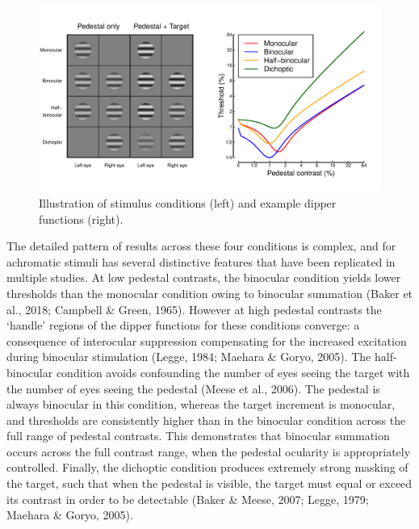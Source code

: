 \documentclass[
]{article}
\begin{document}
\begin{figure}

{\centering \includegraphics{Figures/exampledips} 

}

\caption{Illustration of stimulus conditions (left) and example dipper functions (right).}\label{fig:exampledips}
\end{figure}

The detailed pattern of results across these four conditions is complex, and for achromatic stimuli has several distinctive features that have been replicated in multiple studies. At low pedestal contrasts, the binocular condition yields lower thresholds than the monocular condition owing to binocular summation (Baker et al., 2018; Campbell \& Green, 1965). However at high pedestal contrasts the `handle' regions of the dipper functions for these conditions converge: a consequence of interocular suppression compensating for the increased excitation during binocular stimulation (Legge, 1984; Maehara \& Goryo, 2005). The half-binocular condition avoids confounding the number of eyes seeing the target with the number of eyes seeing the pedestal (Meese et al., 2006). The pedestal is always binocular in this condition, whereas the target increment is monocular, and thresholds are consistently higher than in the binocular condition across the full range of pedestal contrasts. This demonstrates that binocular summation occurs across the full contrast range, when the pedestal ocularity is appropriately controlled. Finally, the dichoptic condition produces extremely strong masking of the target, such that when the pedestal is visible, the target must equal or exceed its contrast in order to be detectable (Baker \& Meese, 2007; Legge, 1979; Maehara \& Goryo, 2005).
\end{document}
